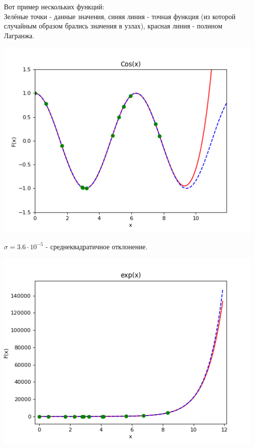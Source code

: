 \documentclass[12pt,a4paper]{scrartcl}
\begin{document}
		Вот пример нескольких функций:\\
		Зелёные точки - данные значения, синяя линия - точная функция (из которой случайным образом брались значения в узлах), красная линия - полином Лагранжа.\\
		\begin{center}
			\includegraphics[scale=0.8]{figure_1} \\
		\end{center}
		 $\sigma = 3.6 \cdot 10^{-5}$ - среднеквадратичное отклонение. \\
		\begin{center}
			\includegraphics[scale=0.8]{figure_2} \\
		\end{center}
\end{document}
